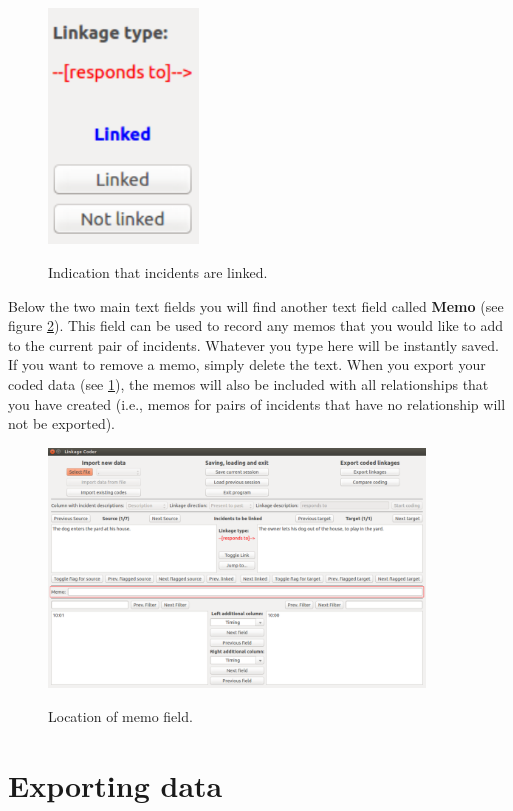 \documentclass{memoir}
\begin{document}
\begin{figure}[h!]
  \centering
  \caption{Indication that incidents are linked.}
  \includegraphics[width=40mm]{Screenshot_10.pdf}
  \label{fig:linkage}
\end{figure}

Below the two main text fields you will find another text field called \textbf{Memo} (see figure \ref{fig:memo}). This field can be used to record any memos that you would like to add to the current pair of incidents. Whatever you type here will be instantly saved. If you want to remove a memo, simply delete the text. When you export your coded data (see \ref{sec:exportingdata}), the memos will also be included with all relationships that you have created (i.e., memos for pairs of incidents that have no relationship will not be exported). 

\begin{figure}[h!]
  \centering
  \caption{Location of memo field.}
  \includegraphics[width=100mm]{Screenshot_11.pdf}
  \label{fig:memo}
\end{figure}


\section{Exporting data}
\label{sec:exportingdata}
\end{document}
